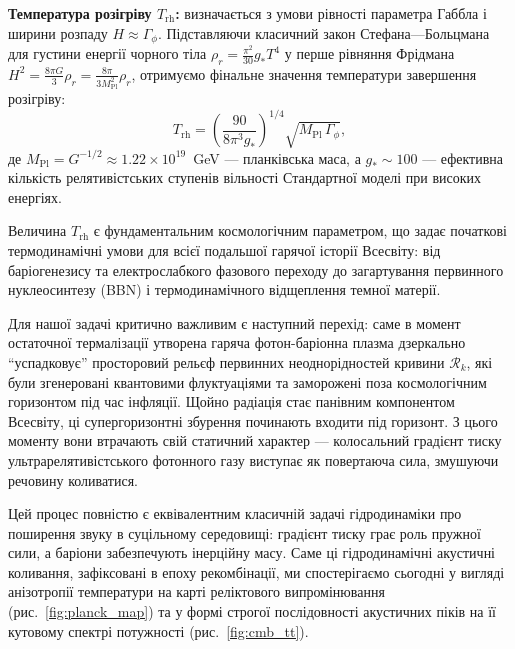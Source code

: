 \begin{keybox}
\textbf{Температура розігріву $T_\mathrm{rh}$:}
визначається з умови рівності параметра Габбла і ширини розпаду $H \approx \Gamma_\phi$. Підставляючи класичний закон Стефана---Больцмана для густини енергії чорного тіла $\rho_r = \frac{\pi^2}{30}g_* T^4$ у перше рівняння Фрідмана $H^2 = \frac{8\pi G}{3}\rho_r = \frac{8\pi}{3 M_{\mathrm{Pl}}^2}\rho_r$, отримуємо фінальне значення температури завершення розігріву:
\begin{equation}\label{eq:t_reheating}
  T_\mathrm{rh}
    = \left(\frac{90}{8\pi^3 g_*}\right)^{\!1/4}
      \sqrt{M_\mathrm{Pl}\,\Gamma_\phi},
\end{equation}
де $M_{\mathrm{Pl}} = G^{-1/2} \approx 1.22 \times 10^{19}$~GeV --- планківська маса, а $g_* \sim 100$ --- ефективна кількість релятивістських ступенів вільності Стандартної моделі при високих енергіях.
\end{keybox}

Величина $T_\mathrm{rh}$ є фундаментальним космологічним параметром, що задає початкові термодинамічні умови для всієї подальшої гарячої історії Всесвіту: від баріогенезису та електрослабкого фазового переходу до загартування первинного нуклеосинтезу (BBN) і термодинамічного відщеплення темної матерії.

Для нашої задачі критично важливим є наступний перехід: саме в момент остаточної термалізації утворена гаряча фотон-баріонна плазма дзеркально \enquote{успадковує} просторовий рельєф первинних неоднорідностей кривини $\mathcal{R}_k$, які були згенеровані квантовими флуктуаціями та заморожені поза космологічним горизонтом під час інфляції. Щойно радіація стає панівним компонентом Всесвіту, ці супергоризонтні збурення починають входити під горизонт. З цього моменту вони втрачають свій статичний характер --- колосальний градієнт тиску ультрарелятивістського фотонного газу виступає як повертаюча сила, змушуючи речовину коливатися.

Цей процес повністю є еквівалентним класичній задачі гідродинаміки про поширення звуку в суцільному середовищі: градієнт тиску грає роль пружної сили, а баріони забезпечують інерційну масу. Саме ці гідродинамічні акустичні коливання, зафіксовані в епоху рекомбінації, ми спостерігаємо сьогодні у вигляді анізотропії температури на карті реліктового випромінювання (рис.~\ref{fig:planck_map}) та у формі строгої послідовності акустичних піків на її кутовому спектрі потужності (рис.~\ref{fig:cmb_tt}).


